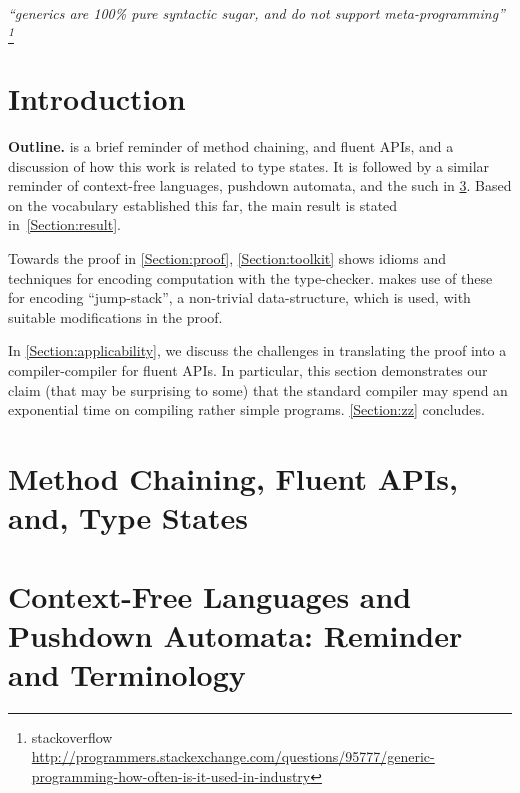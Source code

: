 \documentclass[a4paper,USenglish]{lipics}
\author{Anonymized for the submission}
\begin{document}
\maketitle
\hfill
  \parbox{40ex}{%
    \begin{flushright}
    \scriptsize\itshape ``\protect \Java   generics are 100\protect\% pure syntactic sugar,
    and do not support meta-programming''%
\footnote{%
      stackoverflow
      \tiny
       \url{http://programmers.stackexchange.com/questions/95777/generic-programming-how-often-is-it-used-in-industry}
    }
    \end{flushright}
  }
\newline

\begin{abstract}
  
\end{abstract}

\section{Introduction}


\textbf{Outline.}
 is a brief reminder of method chaining, 
  and fluent APIs, and a discussion of how this work is related to type states.
It is followed by a similar reminder of context-free languages, pushdown automata, 
  and the such in \cref{Section:pushdown}.
Based on the vocabulary established this far, 
  the main result is stated in~\cref{Section:result}.

Towards the proof in \cref{Section:proof}, \cref{Section:toolkit} 
  shows idioms and techniques for encoding computation with    
  the \Java type-checker.
 makes use of these for encoding 
  ``jump-stack'', a non-trivial data-structure,
  which is used, with suitable modifications in the proof. 

In \cref{Section:applicability}, we discuss the challenges in
  translating the proof into a compiler-compiler for fluent APIs.
In particular, this section demonstrates our claim (that may be
  surprising to some) that the standard \Java compiler may spend
  an exponential time on compiling rather simple programs.
\cref{Section:zz} concludes.

  
\section{Method Chaining, Fluent APIs, and, Type States}
\label{Section:fluent}


\section{Context-Free Languages and Pushdown Automata: Reminder and Terminology}
\label{Section:pushdown}

\end{document}
